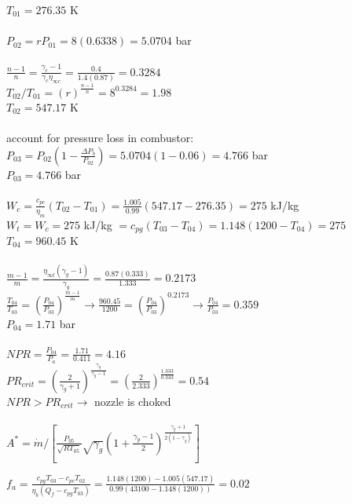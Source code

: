 \documentclass{article}
\begin{document}
$T_{01}=276.35$ K \\\\
$P_{02}=rP_{01}=8(0.6338)=5.0704$ bar \\\\
$\frac{n-1}{n}=\frac{\gamma_c-1}{\gamma_c\eta_{\infty c}}=\frac{0.4}{1.4(0.87)}=0.3284$ \\
$T_{02}/T_{01}=(r)^\frac{n-1}{n}=8^{0.3284}=1.98$ \\
$T_{02}=547.17$ K \\\\
account for pressure loss in combustor: $P_{03}=P_{02}(1-\frac{\Delta P_b}{P_{02}})=
5.0704(1-0.06)=4.766$ bar \\
$P_{03}=4.766$ bar \\\\
$W_c=\frac{c_{pc}}{\eta_m}(T_{02}-T_{01})=\frac{1.005}{0.99}(547.17-276.35)=275$ kJ/kg \\
$W_t=W_c=275$ kJ/kg $=c_{pg}(T_{03}-T_{04})=1.148(1200-T_{04})=275$ \\
$T_{04}=960.45$ K \\\\
$\frac{m-1}{m}=\frac{\eta_{\infty t}(\gamma_g-1)}{\gamma_g}=\frac{0.87(0.333)}{1.333}=0.2173$ \\
$\frac{T_{04}}{T_{03}}=(\frac{P_{04}}{P_{03}})^\frac{m-1}{m} \rightarrow \frac{960.45}{1200}=
(\frac{P_{04}}{P_{03}})^{0.2173} \rightarrow \frac{P_{04}}{P_{03}}=0.359$ \\
$P_{04}=1.71$ bar \\\\
$NPR=\frac{P_{04}}{P_a}=\frac{1.71}{0.411}=4.16$ \\
$PR_{crit}=(\frac{2}{\gamma_g+1})^\frac{\gamma_g}{\gamma_g-1}=(\frac{2}{2.333})^
\frac{1.333}{0.333}=0.54$ \\
$NPR>PR_{crit} \rightarrow$ nozzle is choked \\\\
$A^*=\dot{m}/[\frac{P_{05}}{\sqrt{RT_{05}}}\sqrt{\gamma_g}(1+\frac{\gamma_g-1}{2})^
\frac{\gamma_g+1}{2(1-\gamma_g)}]$

$f_{a}=\frac{c_{pg}T_{03}-c_{pc}T_{02}}{\eta_b(Q_f-c_{pg}T_{03})}=\frac{1.148(1200)-1.005(547.17)}
{0.99(43100-1.148(1200))}=0.02$ \\
\end{document}
